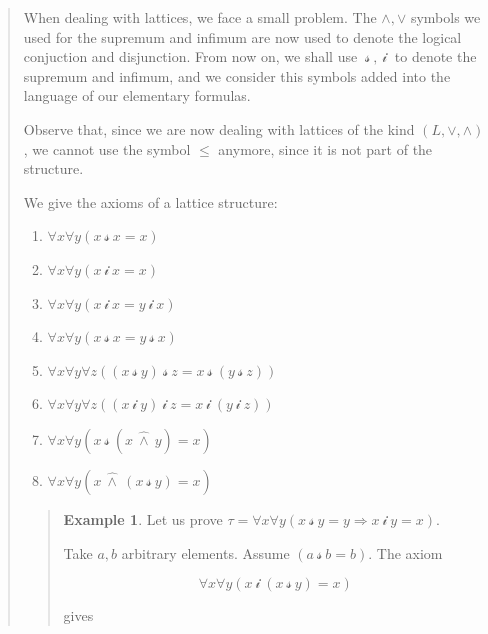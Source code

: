 \documentclass[a4paper, 12pt]{article}
\theoremstyle{definition}
\theoremstyle{definition}
\newtheorem{example}{Example}
\theoremstyle{definition}
\begin{document}
\begin{quote}
When dealing with lattices, we face a small problem. The $\land , \lor $
symbols we used for the supremum and infimum are now used to denote the logical
conjuction and disjunction. From now on, we shall use $~\mathcal{s}~,
~\mathcal{i}~$ to denote the supremum and infimum, and we consider this 
symbols added into the language of our elementary formulas. 

Observe that, since we are now dealing with lattices of the kind $(L, \lor,
\land)$, we cannot use the symbol $\leq$ anymore, since it is not part of the
structure.

We give the axioms of a lattice structure: 

\begin{enumerate}
    \item $\forall x \forall  y \left( x ~\mathcal{s}~ x = x \right) $
    \item $\forall x \forall  y \left( x ~\mathcal{i}~ x = x \right) $
    \item $\forall x \forall  y \left( x ~\mathcal{i}~ x = y ~\mathcal{i}~ x \right) $
    \item $\forall x \forall  y \left( x ~\mathcal{s}~ x = y ~\mathcal{s}~ x \right) $
    \item $\forall x \forall  y \forall z\left( (x ~\mathcal{s}~y) ~\mathcal{s}~z = x ~\mathcal{s}~(y ~\mathcal{s}~z) \right) $
    \item $\forall x \forall  y \forall z\left( (x ~\mathcal{i}~y) ~\mathcal{i}~z = x ~\mathcal{i}~(y ~\mathcal{i}~z) \right) $
    \item $\forall x \forall  y \left( x ~\mathcal{s}~(x ~\hat{\land }~y) = x \right) $
    \item $\forall x \forall  y \left( x ~\hat{\land }~(x ~\mathcal{s}~y) = x \right) $
\end{enumerate}


\small
\begin{quote}

\begin{example}
    Let us prove $\tau = \forall x \forall y \left( x ~\mathcal{s}~y = y \Rightarrow x ~\mathcal{i}~ y = x \right) $. 

    Take $a, b$ arbitrary elements. Assume $(a ~\mathcal{s}~b = b)$. The axiom 

    \begin{equation*}
        \forall x \forall y (x ~\mathcal{i}~ (x ~\mathcal{s}~ y) = x)
    \end{equation*}

    gives 


\end{example}
\end{quote}
\end{quote}
\end{document}
